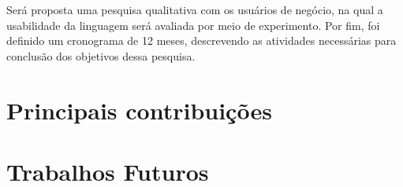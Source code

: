 Será proposta uma pesquisa qualitativa com os usuários de negócio, na qual a usabilidade da linguagem será avaliada por meio de experimento. Por fim, foi definido um cronograma de 12 meses, descrevendo as atividades necessárias para conclusão dos objetivos dessa 
pesquisa.



\section{Principais contribuições}
\label{principaiscontribuicoes}


\section{Trabalhos Futuros}
\label{trabalhosfuturos}